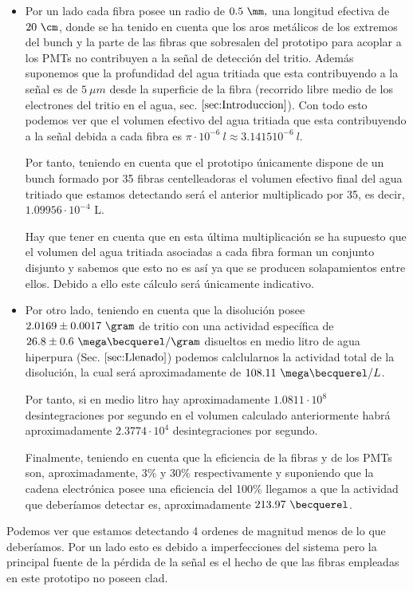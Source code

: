 \begin{itemize}
 \item{} Por un lado cada fibra posee un radio de $0.5~\mm,$ una longitud efectiva de $20~\cm$, donde se ha tenido en cuenta que los aros metálicos de los extremos del bunch y la parte de las fibras que sobresalen del prototipo para acoplar a los PMTs no contribuyen a la señal de detección del tritio. Además suponemos que la profundidad del agua tritiada que esta contribuyendo a la señal es de $5~\mu m$ desde la superficie de la fibra (recorrido libre medio de los electrones del tritio en el agua, sec. $\ref{sec:Introduccion}$). Con todo esto podemos ver que el volumen efectivo del agua tritiada que esta contribuyendo a la señal debida a cada fibra es  $\pi \cdotp 10^{-6}~l \approx 3.1415 10^{-6}~l$. 
 
Por tanto, teniendo en cuenta que el prototipo únicamente dispone de un bunch formado por 35 fibras centelleadoras el volumen efectivo final del agua tritiado que estamos detectando será el anterior multiplicado por 35, es decir, $1.09956\cdotp 10^{-4}$ L. 

Hay que tener en cuenta que en esta última multiplicación se ha supuesto que el volumen del agua tritiada asociadas a cada fibra forman un conjunto disjunto y sabemos que esto no es así ya que se producen solapamientos entre ellos. Debido a ello este cálculo será únicamente indicativo.

\item{} Por otro lado, teniendo en cuenta que la disolución posee $2.0169 \pm 0.0017~\gram$ de tritio con una actividad específica de $26.8 \pm 0.6~\mega\becquerel/\gram$ disueltos en medio litro de agua hiperpura (Sec. $\ref{sec:Llenado}$) podemos calclularnos la actividad total de la disolución, la cual será aproximadamente de $108.11~\mega\becquerel/L$. 

Por tanto, si en medio litro hay aproximadamente $1.0811\cdotp 10^{8}$ desintegraciones por segundo en el volumen calculado anteriormente habrá aproximadamente $2.3774\cdotp 10^{4}$ desintegraciones por segundo.

Finalmente, teniendo en cuenta que la eficiencia de la fibras y de los PMTs son, aproximadamente, 3\% y 30\% respectivamente y suponiendo que la cadena electrónica posee una eficiencia del 100\% llegamos a que la actividad que deberíamos detectar es, aproximadamente $213.97~\becquerel$.

\end{itemize}

Podemos ver que estamos detectando 4 ordenes de magnitud menos de lo que deberíamos. Por un lado esto es debido a imperfecciones del sistema pero la principal fuente de la pérdida de la señal es el hecho de que las fibras empleadas en este prototipo no poseen clad. 


